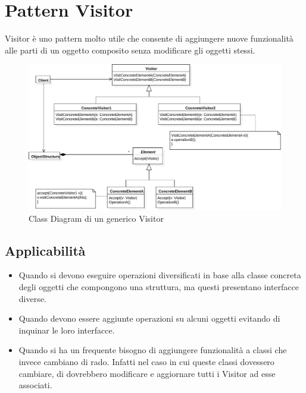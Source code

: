\section{Pattern Visitor}
\label{sec:visitor}
Visitor è uno pattern molto utile che consente di aggiungere nuove funzionalità alle parti di un oggetto composito senza modificare gli oggetti stessi.
\begin{figure}[htbp]
\centering
\includegraphics[width=\textwidth,height=\textheight,keepaspectratio]{images/visitor-design-pattern.pdf}
\caption{Class Diagram di un generico Visitor}
\label{fig:visitor-design-pattern}
\end{figure}

\subsection{Applicabilità}
\begin{itemize}
\item Quando si devono eseguire operazioni diversificati in base alla classe concreta degli oggetti che compongono una struttura, ma questi presentano interfacce diverse.
\item Quando devono essere aggiunte operazioni su alcuni oggetti evitando di inquinar le loro interfacce.
\item Quando si ha un frequente bisogno di aggiungere funzionalità a classi che invece cambiano di rado. Infatti nel caso in cui queste classi dovessero cambiare, di dovrebbero modificare e aggiornare tutti i Visitor ad esse associati.
\end{itemize}

